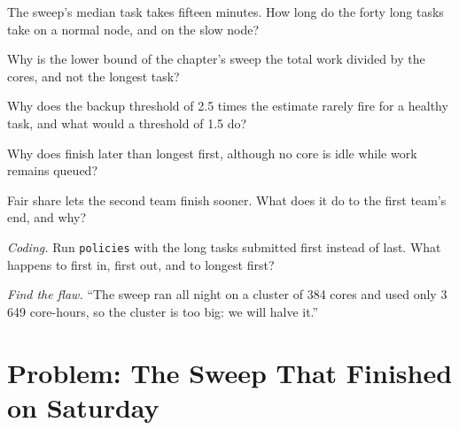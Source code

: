 \begin{exercise}[$\star$]\label{exo:pl:distributed-compute-and-schedulers:2}
The sweep's median task takes fifteen minutes. How long do the forty long tasks take on a normal node, and on the slow node?
\end{exercise}

\begin{exercise}[$\star$]\label{exo:pl:distributed-compute-and-schedulers:3}
Why is the lower bound of the chapter's sweep the total work divided by the cores, and not the longest task?
\end{exercise}

\begin{exercise}[$\star\star$]\label{exo:pl:distributed-compute-and-schedulers:4}
Why does the backup threshold of 2.5 times the estimate rarely fire for a healthy task, and what would a threshold of 1.5 do?
\end{exercise}

\begin{exercise}[$\star\star$]\label{exo:pl:distributed-compute-and-schedulers:5}
Why does  finish later than longest first, although no core is idle while work remains queued?
\end{exercise}

\begin{exercise}[$\star\star$]\label{exo:pl:distributed-compute-and-schedulers:6}
Fair share lets the second team finish sooner. What does it do to the first team's end, and why?
\end{exercise}

\begin{exercise}[$\star\star\star$]\label{exo:pl:distributed-compute-and-schedulers:7}
\emph{Coding.} Run \texttt{policies} with the long tasks submitted first instead of last. What happens to first in, first out, and to
longest first?
\end{exercise}

\begin{exercise}[$\star\star\star$]\label{exo:pl:distributed-compute-and-schedulers:8}
\emph{Find the flaw.} ``The sweep ran all night on a cluster of 384 cores and used only 3\,649 core-hours, so the cluster is too big: we
will halve it.''
\end{exercise}

\section{Problem: The Sweep That Finished on Saturday}

